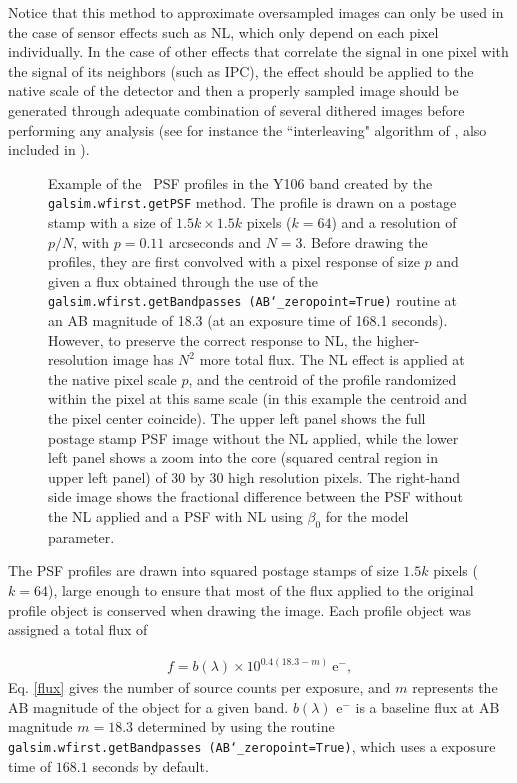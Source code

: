 \documentclass[11pt,preprint,flushrt]{aastex}
\begin{document}
Notice that this method to approximate oversampled images can only be used in the case of sensor effects such as NL, which only depend on each pixel individually. In the case of other effects that correlate the signal in one pixel with the signal of its neighbors (such as IPC), the effect should be applied to the native scale of the detector and then a properly sampled image should be generated through adequate combination of several dithered images before performing any analysis (see for instance the ``interleaving" algorithm of \citealt{kannawadi15}, also included in \gs). 

\begin{figure}[!ht]
\centering
{}
\caption{Example of the \wfa\ PSF profiles in the Y106 band created by the {\tt{galsim.wfirst.getPSF}} method. The profile is drawn on a postage stamp with a size of $1.5k \times1.5k$ pixels ($k=64$) and a resolution of $p/N$, with $p=0.11$ arcseconds and $N=3$. Before drawing the profiles, they are first convolved with a pixel response of size $p$ and given a flux obtained through the use of the {\tt{galsim.wfirst.getBandpasses (AB\char`_zeropoint=True)}} routine at an AB magnitude of 18.3 (at an exposure time of 168.1 seconds). However, to preserve the correct response to NL, the higher-resolution image has $N^2$ more total flux. The NL effect is applied at the native pixel scale $p$, and the centroid of the profile randomized within the pixel at this same scale (in this example the centroid and the pixel center coincide). The upper left panel shows the full postage stamp PSF image without the NL applied, while the lower left panel shows a zoom into the core (squared central region in upper left panel) of 30 by 30 high resolution pixels. The right-hand side image shows the fractional difference between the PSF without the NL applied and a PSF with NL using $\beta_0$ for the model parameter.} 
\label{f1}
\end{figure}

The PSF profiles are drawn into squared postage stamps of size $1.5k$ pixels ($k=64$), large enough to ensure that most of the flux applied to the original profile object is conserved when drawing the image. %
Each profile object was assigned a total flux of 

\begin{align}
f=b(\lambda)\times10^{0.4 (18.3-m)} \ \mathrm{e^-}, 
\label{flux}
\end{align}
Eq. \ref{flux} gives the number of source counts per exposure, and $m$ represents the AB magnitude of the object for a given band. $b(\lambda)$ e$^{-}$ is a baseline flux at AB magnitude $m=18.3$ determined by using the routine {\tt{galsim.wfirst.getBandpasses (AB\char`_zeropoint=True)}}, which uses a exposure time of $168.1$ seconds by default. 
\end{document}

